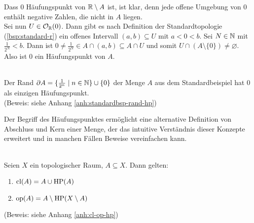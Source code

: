     \begin{bew}
        Dass $0$ Häufungspunkt von $\mathbb{R} \setminus A$ ist, ist klar, denn jede offene Umgebung von $0$ enthält negative Zahlen, die nicht in $A$ liegen.\\
        Sei nun $U \in \mathcal{O}_{\mathbb{R}}({0})$. Dann gibt es nach Definition der Standardtopologie (\ref{bsp:standard-r}) ein offenes Intervall $(a,b) \subseteq U$ mit $a < 0 < b$.
        Sei $N \in \mathbb{N}$ mit $\frac{1}{2^N} < b$. Dann ist $0 \neq \frac{1}{2^N} \in A \cap (a,b) \subseteq A \cap U$ und somit $U \cap (A \setminus \{0\}) \neq \varnothing$.
        Also ist $0$ ein Häufungspunkt von $A$.
    \end{bew}

    
    \begin{bsp}\label{bsp:standardbsp-rand-hp}\ \\
        Der Rand $\partial A = \{\frac{1}{2^n} \mid n \in \mathbb{N}\} \cup \{0\}$ der Menge $A$ aus dem Standardbeispiel hat $0$ als einzigen Häufungspunkt.\\
        (Beweis: siehe Anhang \ref{anh:standardbsp-rand-hp})
    \end{bsp}

    Der Begriff des Häufungspunktes ermöglicht eine alternative Definition von Abschluss und Kern einer Menge, der das intuitive Verständnis dieser Konzepte erweitert und in manchen Fällen Beweise vereinfachen kann.
    \begin{satz}\label{satz:cl-op-hp}\ \\
        Seien $X$ ein topologischer Raum, $A \subseteq X$. Dann gelten:
        \begin{enumerate}
            \item $\text{cl}(A) = A \cup \text{HP}(A)$
            \item $\text{op}(A) = A \setminus \text{HP}(X \setminus A)$
        \end{enumerate}
        (Beweis: siehe Anhang \ref{anh:cl-op-hp})
    \end{satz}

